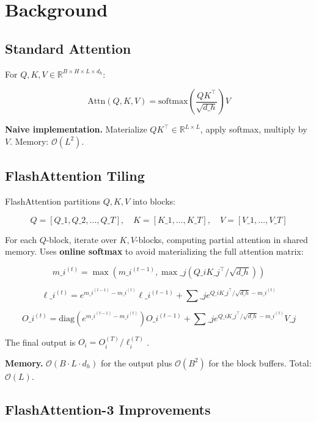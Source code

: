 \section{Background}

\subsection{Standard Attention}

For $Q, K, V \in \mathbb{R}^{B \times H \times L \times d_h}$:

\[
\text{Attn}(Q, K, V) = \text{softmax}\!\left(\frac{Q K^\top}{\sqrt{d\_h}}\right) V
\tag{3.1}
\]

\textbf{Naive implementation.} Materialize $QK^\top \in \mathbb{R}^{L \times L}$, 
apply softmax, multiply by $V$. Memory: $\mathcal{O}(L^2)$.

\subsection{FlashAttention Tiling}

FlashAttention partitions $Q, K, V$ into blocks:

\[
Q = [Q\_1, Q\_2, \dots, Q\_T], \quad K = [K\_1, \dots, K\_T], \quad V = [V\_1, \dots, V\_T]
\tag{3.2}
\]

For each $Q$-block, iterate over $K, V$-blocks, computing partial attention 
in shared memory. Uses \textbf{online softmax} to avoid materializing the full 
attention matrix:

\[
m\_i^{(t)} = \max(m\_i^{(t-1)}, \max\_j (Q\_i K\_j^\top / \sqrt{d\_h}))
\tag{3.3}
\]

\[
\ell\_i^{(t)} = e^{m\_i^{(t-1)} - m\_i^{(t)}} \ell\_i^{(t-1)} + \sum\_j e^{Q\_i K\_j^\top / \sqrt{d\_h} - m\_i^{(t)}}
\tag{3.4}
\]

\[
O\_i^{(t)} = \text{diag}(e^{m\_i^{(t-1)} - m\_i^{(t)}}) O\_i^{(t-1)} + \sum\_j e^{Q\_i K\_j^\top / \sqrt{d\_h} - m\_i^{(t)}} V\_j
\tag{3.5}
\]

The final output is $O_i = O_i^{(T)} / \ell_i^{(T)}$.

\textbf{Memory.} $\mathcal{O}(B \cdot L \cdot d_h)$ for the output plus 
$\mathcal{O}(B^2)$ for the block buffers. Total: $\mathcal{O}(L)$.

\subsection{FlashAttention-3 Improvements}

